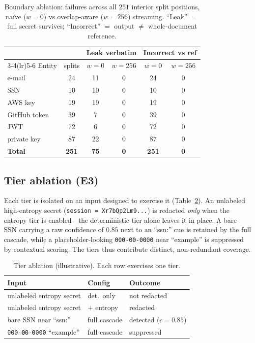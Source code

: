 \documentclass[conference]{IEEEtran}
\begin{document}
\begin{table}[t]
\centering
\caption{Boundary ablation: failures across all $251$ interior split positions,
na\"ive ($w{=}0$) vs overlap-aware ($w{=}256$) streaming. ``Leak'' $=$ full secret
survives; ``Incorrect'' $=$ output $\neq$ whole-document reference.}
\label{tab:boundary}
\footnotesize
\begin{tabular}{@{}lccccc@{}}
\toprule
& & \multicolumn{2}{c}{Leak verbatim} & \multicolumn{2}{c}{Incorrect vs ref} \\
\cmidrule(lr){3-4}\cmidrule(lr){5-6}
Entity & splits & $w{=}0$ & $w{=}256$ & $w{=}0$ & $w{=}256$ \\
\midrule
e-mail        & 24 & 11 & 0 & 24 & 0 \\
SSN           & 10 & 10 & 0 & 10 & 0 \\
AWS key       & 19 & 19 & 0 & 19 & 0 \\
GitHub token  & 39 &  7 & 0 & 39 & 0 \\
JWT           & 72 &  6 & 0 & 72 & 0 \\
private key   & 87 & 22 & 0 & 87 & 0 \\
\midrule
\textbf{Total} & \textbf{251} & \textbf{75} & \textbf{0} & \textbf{251} & \textbf{0} \\
\bottomrule
\end{tabular}
\end{table}

\subsection{Tier ablation (E3)}

Each tier is isolated on an input designed to exercise it (Table~\ref{tab:tierab}).
An unlabeled high-entropy secret (\texttt{session = Xr7bQp2Lm9...}) is redacted
\emph{only} when the entropy tier is enabled---the deterministic tier alone leaves
it in place. A bare SSN carrying a raw confidence of $0.85$ next to an ``ssn:'' cue
is retained by the full cascade, while a placeholder-looking \texttt{000-00-0000}
near ``example'' is suppressed by contextual scoring. The tiers thus contribute
distinct, non-redundant coverage.

\begin{table}[t]
\centering
\caption{Tier ablation (illustrative). Each row exercises one tier.}
\label{tab:tierab}
\footnotesize
\begin{tabular}{@{}lll@{}}
\toprule
Input & Config & Outcome \\
\midrule
unlabeled entropy secret & det.\ only & not redacted \\
unlabeled entropy secret & $+$ entropy & redacted \\
bare SSN near ``ssn:'' & full cascade & detected ($c{=}0.85$) \\
\texttt{000-00-0000} ``example'' & full cascade & suppressed \\
\bottomrule
\end{tabular}
\end{table}
\end{document}
